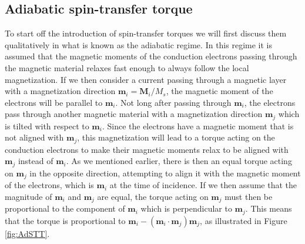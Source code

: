 \subsection{Adiabatic spin-transfer torque} \label{sec:AdSTT}
To start off the introduction of spin-transfer torques we will first discuss them qualitatively in what is known as the adiabatic regime. In this regime it is assumed that the magnetic moments of the conduction electrons passing through the magnetic material relaxes fast enough to always follow the local magnetization. If we then consider a current passing through a magnetic layer with a magnetization direction $\mathbold{m}_i = \mathbold{M}_i/M_s$, the magnetic moment of the electrons will be parallel to $\mathbold{m}_i$. Not long after passing through $\mathbold{m}_i$, the electrons pass through another magnetic material with a magnetization direction $\mathbold{m}_j$ which is tilted with respect to $\mathbold{m}_i$. Since the electrons have a magnetic moment that is not aligned with $\mathbold{m}_j$, this magnetization will lead to a torque acting on the conduction electrons to make their magnetic moments relax to be aligned with $\mathbold{m}_j$ instead of $\mathbold{m}_i$. As we mentioned earlier, there is then an equal torque acting on $\mathbold{m}_j$ in the opposite direction, attempting to align it with the magnetic moment of the electrons, which is $\mathbold{m}_i$ at the time of incidence. If we then assume that the magnitude of $\mathbold{m}_i$ and $\mathbold{m}_j$ are equal, the torque acting on $\mathbold{m}_j$ must then be proportional to the component of $\mathbold{m}_i$ which is perpendicular to $\mathbold{m}_j$. This means that the torque is proportional to $\mathbold{m}_i-(\mathbold{m}_i\cdot\mathbold{m}_j)\mathbold{m}_j$, as illustrated in Figure \ref{fig:AdSTT}.

